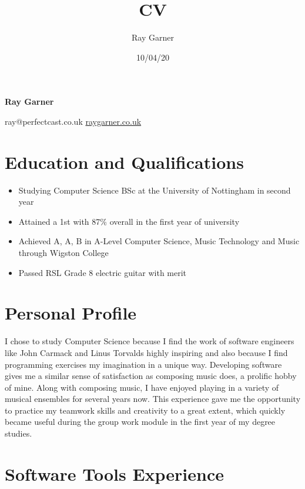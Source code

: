 \documentclass{article}
\title{CV}
\date{10/04/20}
\author{Ray Garner}
\makeatletter
\renewcommand{\maketitle}{
\begin{center}


{\huge\bfseries \vspace{-2cm} Ray Garner}
\vskip 0.25cm

{\large
ray@perfectcast.co.uk\hspace{0.5cm}
\href{https://www.raygarner.co.uk}{raygarner.co.uk}}

\vskip 0.25cm

\end{center}
}
\makeatother
\begin{document}
\maketitle

\section{Education and Qualifications}

\begin{itemize}[noitemsep]

\renewcommand{\labelitemi}{$\square$}
\item Studying Computer Science BSc at the University of Nottingham in second year
\item Attained a 1st with 87\% overall in the first year of university
\item Achieved A, A, B in A-Level Computer Science, Music Technology and Music through Wigston College
\item Passed RSL Grade 8 electric guitar with merit

\end{itemize}

\section{Personal Profile}
I chose to study Computer Science because I find the work of software engineers like John Carmack and Linus Torvalds highly inspiring and also because I find programming exercises my imagination in a unique way.
Developing software gives me a similar sense of satisfaction as composing music does, a prolific hobby of mine.
Along with composing music, I have enjoyed playing in a variety of musical ensembles for several years now. 
This experience gave me the opportunity to practice my teamwork skills and creativity to a great extent, which quickly became useful during the group work module in the first year of my degree studies.

\section{Software Tools Experience}

\renewcommand{\arraystretch}{1.4}
\end{document}
